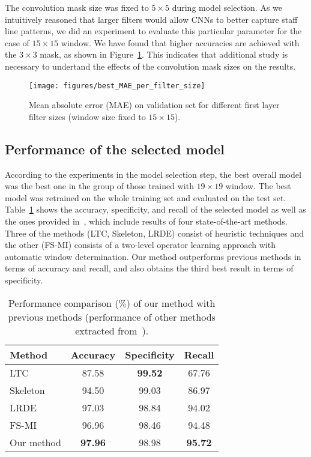 \documentclass[conference]{IEEEtran}
\begin{document}
The convolution mask size was fixed to $5\times 5$ during model
selection. As we intuitively reasoned that larger filters would allow
CNNs to better capture staff line patterns, we did an experiment to
evaluate this particular parameter for the case of $15\times 15$
window. We have found that higher accuracies are achieved with the
$3\times 3$ mask, as shown in Figure~\ref{fig:best_filter_size}.
This indicates that additional study is necessary to undertand the
effects of the convolution mask sizes on the results. 
\begin{figure}[htb]
\centering
\texttt{[image: figures/best\_MAE\_per\_filter\_size]}
\caption{Mean absolute error (MAE) on validation set for 
different first layer filter sizes (window size fixed to $15 \times 15$).}
\label{fig:best_filter_size}
\end{figure}



\subsection{Performance of the selected model}

According to the experiments in the model selection step, the best
overall model was the best one in the group of those trained with
$19\times 19$ window. The best model was retrained on the whole
training set and evaluated on the test set.  
Table~\ref{tab:test_results} shows the accuracy, specificity, and
recall of the selected model as well as the ones provided
in~\cite{2017:IgorPR}, which include results of four state-of-the-art
methods. Three of the methods (LTC, Skeleton, LRDE) consist of
heuristic techniques and the other (FS-MI) consists of a two-level
operator learning approach with automatic window determination.
Our method outperforms previous methods in terms of accuracy and
recall, and also obtains the third best result in terms of
specificity.

\begin{table}[h]
\caption{Performance comparison ($\%$) of our method with previous
  methods (performance of other methods extracted from~\cite{2017:IgorPR}).}
\begin{center}
\begin{tabular}{lccc}
\hline
Method & Accuracy & Specificity & Recall\\ \hline 
LTC &  87.58 & \textbf{99.52} & 67.76\\
Skeleton &  94.50 & 99.03 & 86.97\\
LRDE &  97.03 & 98.84 & 94.02 \\
FS-MI &  96.96 & 98.46 & 94.48\\
Our method &  \textbf{97.96} & 98.98 & \textbf{95.72} \\ \hline
\end{tabular}
\end{center}
\label{tab:test_results}
\end{table}
\end{document}
